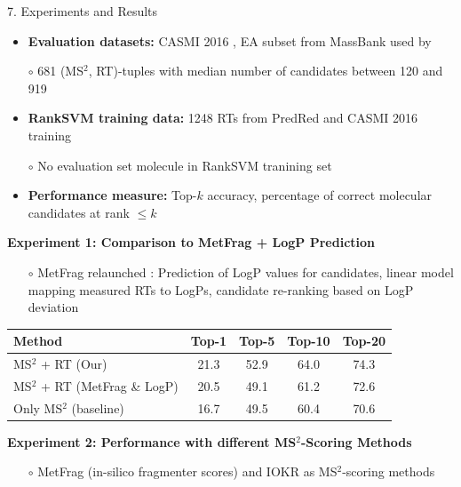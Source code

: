 \documentclass{beamer}
\newcommand{\ms}{MS}
\newcommand{\msms}{\ms$^2$}
\begin{document}
\begin{frame}{}
\begin{columns}[T]
    \begin{block}{{\normalsize 7. Experiments and Results}}
    \begin{itemize}
        \item \textbf{Evaluation datasets:} CASMI 2016 \cite{Schymanski2017}, EA subset from MassBank used by \cite{Ruttkies2016} 
        \item[$\circ$] 681 (\msms, RT)-tuples with median number of candidates between 120 and 919
        \item \textbf{RankSVM training data:} 1248 RTs from PredRed \cite{Stanstrup2015} and CASMI 2016 training
        \item[$\circ$] No evaluation set molecule in RankSVM tranining set
        \item \textbf{Performance measure:} Top-$k$ accuracy, percentage of correct molecular candidates at rank $\leq k$
    \end{itemize}
    \vspace{0.5cm}
    \textbf{Experiment 1: Comparison to MetFrag + LogP Prediction}
    \begin{itemize}
        \item[$\circ$] MetFrag relaunched \cite{Ruttkies2016}: Prediction of LogP values for candidates, linear model mapping measured RTs to LogPs, candidate re-ranking based on LogP deviation
    \end{itemize}
        \begin{table}
            \centering
            \begin{tabular}{lcccc}
                \toprule
                \textbf{Method} & \textbf{Top-1} & \textbf{Top-5} & \textbf{Top-10} & \textbf{Top-20} \\ \midrule
                \msms{} + RT (Our) & 21.3 & 52.9 & 64.0 & 74.3 \\
                \msms{} + RT (MetFrag \& LogP) & 20.5 & 49.1 & 61.2 & 72.6 \\ \cmidrule(lr){1-5}
                Only \msms{} (baseline) & 16.7 & 49.5 & 60.4 & 70.6 \\
                \bottomrule
            \end{tabular}
        \end{table}
    \vspace{1cm}
    \textbf{Experiment 2: Performance with different \msms{}-Scoring Methods}
    \begin{itemize}
        \item[$\circ$] MetFrag (in-silico fragmenter scores) and IOKR \cite{Brouard_ismb_2016} as \msms{}-scoring methods

\end{itemize}
\end{block}
\end{columns}
\end{frame}
\end{document}
